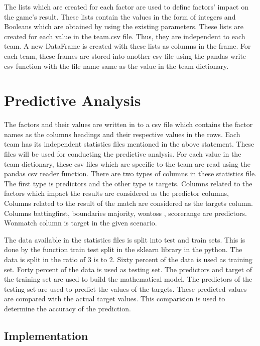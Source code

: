 \documentclass[sigconf]{acmart}
\begin{document}
The lists which are created for each factor are used to define factors’ impact on the game’s result. These lists contain the values in the form of integers and Booleans which are obtained by using the existing parameters. These lists are created for each value in the team.csv file. Thus, they are independent to each team. A new DataFrame is created with these lists as columns in the frame. For each team, these frames are stored into another csv file using the pandas write csv function with the file name same as the value in the team dictionary.

\section{Predictive Analysis}

The factors and their values are written in to a csv file which contains the factor names as the columns headings and their respective values in the rows. Each team has its independent statistics files mentioned in the above statement. These files will be used for conducting the predictive analysis. For each value in the team dictionary, these csv files which are specific to the team are read using the pandas csv reader function.  There are two types of columns in these statistics file. The first type is predictors and the other type is targets. Columns related to the factors which impact the results are considered as the predictor columns, Columns related to the result of the match are considered as the targets column. Columns battingfirst, boundaries majority, wontoss , scorerange are predictors. Wonmatch column is target in the given scenario. 

The data available in the statistics files is split into test and train sets. This is done by the function train test split in the sklearn library in the python. The data is split in the ratio of 3 is to 2. Sixty percent of the data is used as training set. Forty percent of the data is used as testing set. The predictors and target of the training set are used to build the mathematical model. The predictors of the testing set are used to predict the values of the targets. These predicted values are compared with the actual target values. This comparision is used to determine the accuracy of the prediction.

\subsection{Implementation}
\end{document}
